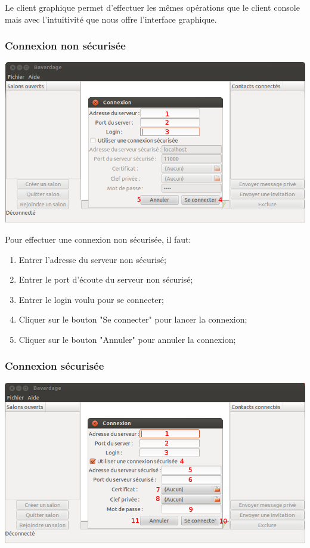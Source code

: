 \documentclass[a4paper,11pt,french]{book}
\begin{document}
Le client graphique permet d'effectuer les mêmes opérations que le client console mais avec l'intuitivité que nous offre l'interface graphique.

\subsubsection{Connexion non sécurisée}
\includegraphics[width=40em]{capture/con_n_sec.png}

Pour effectuer une connexion non sécurisée, il faut:
\begin{enumerate}
    \item Entrer l'adresse du serveur non sécurisé;
    \item Entrer le port d'écoute du serveur non sécurisé;
    \item Entrer le login voulu pour se connecter;
    \item Cliquer sur le bouton "Se connecter" pour lancer la connexion;
    \item Cliquer sur le bouton "Annuler" pour annuler la connexion;
\end{enumerate}

\subsubsection{Connexion sécurisée}

\includegraphics[width=40em]{capture/con_sec.png}
\end{document}

